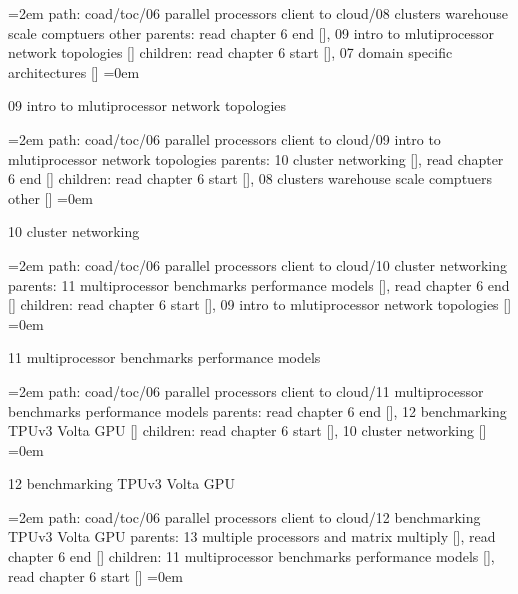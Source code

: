 \smallskip
\par\begingroup
\leftskip=2em
path: coad/toc/06 parallel processors client to cloud/08 clusters warehouse scale comptuers other
\smallskip
parents:  read chapter 6 end [], 09 intro to mlutiprocessor network topologies []
\smallskip
children: read chapter 6 start [], 07 domain specific architectures []
\smallskip
\leftskip=0em
\par\endgroup
\bigskip
{}
09 intro to mlutiprocessor network topologies
\smallskip
\par\begingroup
\leftskip=2em
path: coad/toc/06 parallel processors client to cloud/09 intro to mlutiprocessor network topologies
\smallskip
parents:  10 cluster networking [], read chapter 6 end []
\smallskip
children: read chapter 6 start [], 08 clusters warehouse scale comptuers other []
\smallskip
\leftskip=0em
\par\endgroup
\bigskip
{}
10 cluster networking
\smallskip
\par\begingroup
\leftskip=2em
path: coad/toc/06 parallel processors client to cloud/10 cluster networking
\smallskip
parents:  11 multiprocessor benchmarks performance models [], read chapter 6 end []
\smallskip
children: read chapter 6 start [], 09 intro to mlutiprocessor network topologies []
\smallskip
\leftskip=0em
\par\endgroup
\bigskip
{}
11 multiprocessor benchmarks performance models
\smallskip
\par\begingroup
\leftskip=2em
path: coad/toc/06 parallel processors client to cloud/11 multiprocessor benchmarks performance models
\smallskip
parents:  read chapter 6 end [], 12 benchmarking TPUv3 Volta GPU []
\smallskip
children: read chapter 6 start [], 10 cluster networking []
\smallskip
\leftskip=0em
\par\endgroup
\bigskip
{}
12 benchmarking TPUv3 Volta GPU
\smallskip
\par\begingroup
\leftskip=2em
path: coad/toc/06 parallel processors client to cloud/12 benchmarking TPUv3 Volta GPU
\smallskip
parents:  13 multiple processors and matrix multiply [], read chapter 6 end []
\smallskip
children: 11 multiprocessor benchmarks performance models [], read chapter 6 start []
\smallskip
\leftskip=0em
\par\endgroup
\bigskip
{}
